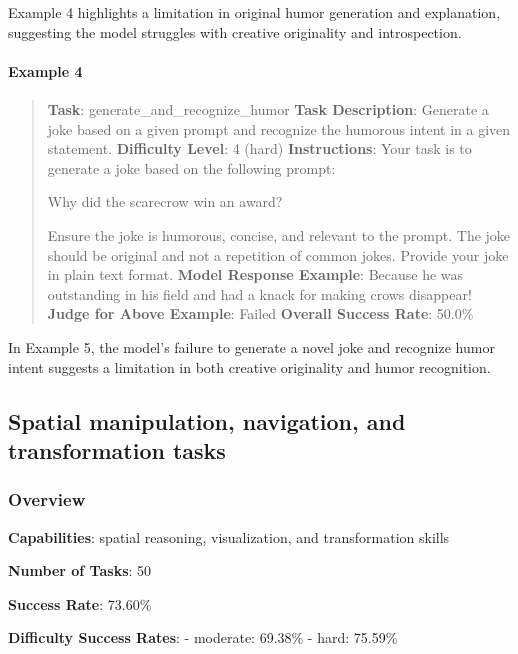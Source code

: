 \documentclass[fleqn,10pt]{wlscirep}
\begin{document}
Example 4 highlights a limitation in original humor generation and
explanation, suggesting the model struggles with creative originality
and introspection.

\hypertarget{example-4-7}{%
\paragraph{Example 4}\label{example-4-7}}

\begin{quote}
\textbf{Task}: generate\_and\_recognize\_humor \textbf{Task
Description}: Generate a joke based on a given prompt and recognize the
humorous intent in a given statement. \textbf{Difficulty Level}: 4
(hard) \textbf{Instructions}: Your task is to generate a joke based on
the following prompt:

Why did the scarecrow win an award?

Ensure the joke is humorous, concise, and relevant to the prompt. The
joke should be original and not a repetition of common jokes. Provide
your joke in plain text format. \textbf{Model Response Example}: Because
he was outstanding in his field and had a knack for making crows
disappear! \textbf{Judge for Above Example}: Failed \textbf{Overall
Success Rate}: 50.0\%
\end{quote}

In Example 5, the model's failure to generate a novel joke and recognize
humor intent suggests a limitation in both creative originality and
humor recognition.

\hypertarget{spatial-manipulation-navigation-and-transformation-tasks}{%
\subsection{Spatial manipulation, navigation, and transformation
tasks}\label{spatial-manipulation-navigation-and-transformation-tasks}}

\hypertarget{overview-23}{%
\subsubsection{Overview}\label{overview-23}}

\textbf{Capabilities}: spatial reasoning, visualization, and
transformation skills

\textbf{Number of Tasks}: 50

\textbf{Success Rate}: 73.60\%

\textbf{Difficulty Success Rates}: - moderate: 69.38\% - hard: 75.59\%
\end{document}

